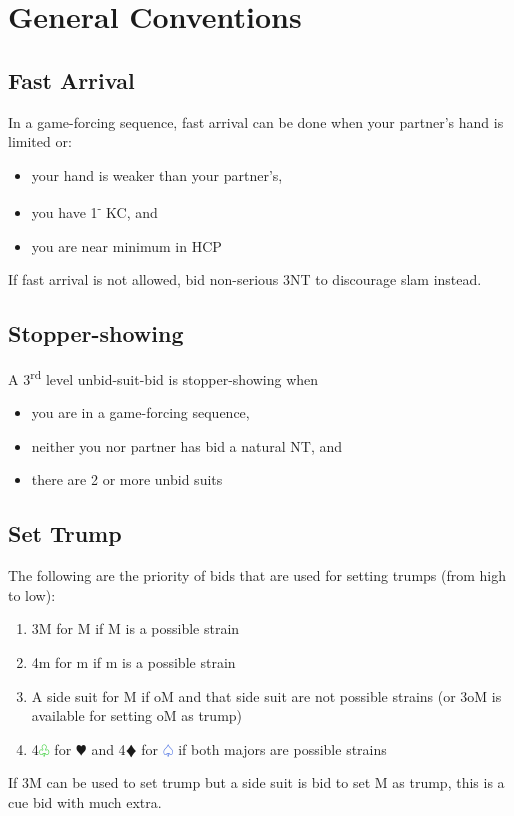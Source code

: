 \documentclass{article}
\renewcommand{\sp}{\textcolor{RoyalBlue}{$\varspade$}}
\newcommand{\he}{\textcolor{RubineRed}{$\varheart$}}
\newcommand{\di}{\textcolor{Peach}{$\vardiamond$}}
\newcommand{\cl}{\textcolor{LimeGreen}{$\varclub$}}
\newcommand{\nt}{\relsize{-1}NT\relsize{1}}
\newcommand{\down}{\textsuperscript{-}}
\begin{document}
\section{General Conventions}

\subsection{Fast Arrival}
In a game-forcing sequence, fast arrival can be done when your partner's hand is limited or:
\begin{itemize}
	\itemsep0em
	\item your hand is weaker than your partner's,
	\item you have 1\down{} KC, and
	\item you are near minimum in HCP
\end{itemize}
If fast arrival is not allowed, bid non-serious 3\nt{} to discourage slam instead.

\subsection{Stopper-showing}
A 3\textsuperscript{rd} level unbid-suit-bid is stopper-showing when
\begin{itemize}
	\itemsep0em
	\item you are in a game-forcing sequence,
	\item neither you nor partner has bid a natural \nt{}, and
	\item there are 2 or more unbid suits
\end{itemize}

\subsection{Set Trump}
The following are the priority of bids that are used for setting trumps (from high to low):
\begin{enumerate}
	\itemsep0em
	\item 3M for M if M is a possible strain
	\item 4m for m if m is a possible strain
	\item A side suit for M if oM and that side suit are not possible strains (or 3oM is available for setting oM as trump)
	\item 4\cl{} for \he{} and 4\di{} for \sp{} if both majors are possible strains
\end{enumerate}
If 3M can be used to set trump but a side suit is bid to set M as trump, this is a cue bid with much extra.
\end{document}
